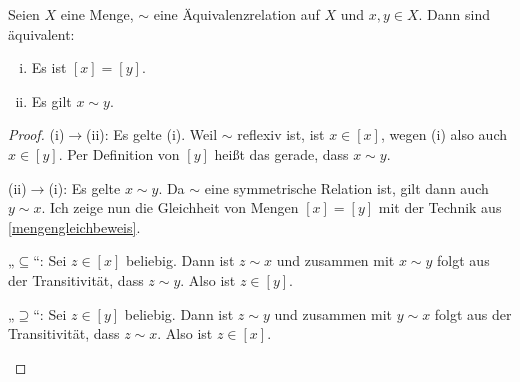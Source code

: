 \begin{satz} \label{aequiklassegleich}
    Seien $X$ eine Menge, $\sim$ eine Äquivalenzrelation auf $X$ und $x,y\in X$. Dann sind äquivalent:
    \begin{enumerate}[(i)]
        \item Es ist $[x]=[y]$.
        \item Es gilt $x\sim y$.
    \end{enumerate}
\end{satz}
\begin{proof}
    (i)$\to$(ii): Es gelte (i). Weil $\sim$ reflexiv ist, ist $x\in [x]$, wegen (i) also auch $x\in [y]$. Per Definition von $[y]$ heißt das gerade, dass $x\sim y$.

    (ii)$\to$(i): Es gelte $x\sim y$. Da $\sim$ eine symmetrische Relation ist, gilt dann auch $y\sim x$. Ich zeige nun die Gleichheit von Mengen $[x]=[y]$ mit der Technik aus \cref{mengengleichbeweis}.
    \begin{labeling}
        \item[„$\subseteq$“:] Sei $z\in [x]$ beliebig. Dann ist $z\sim x$ und zusammen mit $x\sim y$ folgt aus der Transitivität, dass $z\sim y$. Also ist $z\in [y]$.
        \item[„$\supseteq$“:] Sei $z\in [y]$ beliebig. Dann ist $z\sim y$ und zusammen mit $y\sim x$ folgt aus der Transitivität, dass $z\sim x$. Also ist $z\in [x]$. \qedhere
    \end{labeling}
\end{proof}


